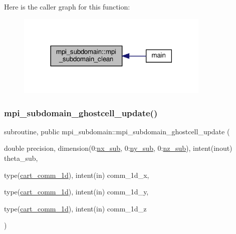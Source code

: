 Here is the caller graph for this function\+:
\nopagebreak
\begin{figure}[H]
\begin{center}
\leavevmode
\includegraphics[width=261pt]{namespacempi__subdomain_a56e9f2afd59e45fcada0f1c21a90eefe_icgraph}
\end{center}
\end{figure}
\mbox{\label{namespacempi__subdomain_a2e34a77537009dd448375e8fdc8d5b62}} 
\subsubsection{\texorpdfstring{mpi\+\_\+subdomain\+\_\+ghostcell\+\_\+update()}{mpi\_subdomain\_ghostcell\_update()}}
{\footnotesize\ttfamily subroutine, public mpi\+\_\+subdomain\+::mpi\+\_\+subdomain\+\_\+ghostcell\+\_\+update (\begin{DoxyParamCaption}\item[{double precision, dimension(0\+:\hyperlink{namespacempi__subdomain_a005fe127fe0fc85b932814a820a36444}{nx\+\_\+sub}, 0\+:\hyperlink{namespacempi__subdomain_a665ba05d0ae9309dd28b9b513a0c87a1}{ny\+\_\+sub}, 0\+:\hyperlink{namespacempi__subdomain_a07555cc931ac78376a4c81207662251f}{nz\+\_\+sub}), intent(inout)}]{theta\+\_\+sub,  }\item[{type(\hyperlink{structmpi__topology_1_1cart__comm__1d}{cart\+\_\+comm\+\_\+1d}), intent(in)}]{comm\+\_\+1d\+\_\+x,  }\item[{type(\hyperlink{structmpi__topology_1_1cart__comm__1d}{cart\+\_\+comm\+\_\+1d}), intent(in)}]{comm\+\_\+1d\+\_\+y,  }\item[{type(\hyperlink{structmpi__topology_1_1cart__comm__1d}{cart\+\_\+comm\+\_\+1d}), intent(in)}]{comm\+\_\+1d\+\_\+z }\end{DoxyParamCaption})}



